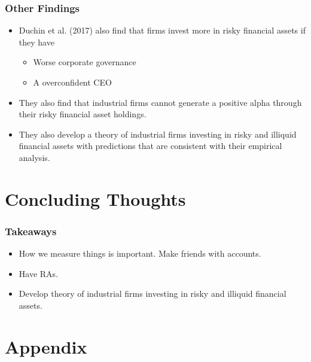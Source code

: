 \documentclass[handout]{beamer}
\begin{document}
\begin{frame}
\frametitle{Other Findings}
\begin{itemize}[<+->]
\item Duchin et al. (2017) also find that firms invest more in risky financial assets if they have

\begin{itemize}[<+->]
\item Worse corporate governance
\item A overconfident CEO
\end{itemize}

\bigskip

\item They also find that industrial firms cannot generate a positive alpha through their risky financial asset holdings.

\bigskip

\item They also develop a theory of industrial firms investing in risky and illiquid financial assets with predictions that are consistent with their empirical analysis.


\end{itemize}

\end{frame}


\section{Concluding Thoughts}




\begin{frame}
\frametitle{Takeaways}
\begin{itemize}[<+->]
\item How we measure things is important. Make friends with accounts.
\item Have RAs.
\bigskip
\item Develop theory of industrial firms investing in risky and illiquid financial assets.

\end{itemize}
\end{frame}




\section{Appendix}
\end{document}
